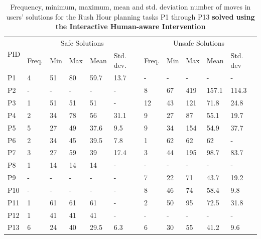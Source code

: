 \begin{table}[tpb]
\begin{tabular}{|l|l|l|l|l|l|l|l|l|l|l|}
\hline
\multirow{2}{*}{PID} & \multicolumn{5}{c|}{Safe Solutions}  & \multicolumn{5}{c|}{Unsafe Solutions} \\ \cline{2-11} 
                     & Freq. & Min & Max & Mean & Std. dev. & Freq.  & Min & Max & Mean  & Std. dev \\ \hline
P1                   & 4     & 51  & 80  & 59.7 & 13.7      & -      & -   & -   & -     & -        \\
P2                   & -     & -   & -   & -    & -         & 8      & 67  & 419 & 157.1 & 114.3    \\
P3                   & 1     & 51  & 51  & 51   & -         & 12     & 43  & 121 & 71.8  & 24.8     \\
P4                   & 2     & 34  & 78  & 56   & 31.1      & 9      & 27  & 87  & 55.1  & 19.7     \\
P5                   & 5     & 27  & 49  & 37.6 & 9.5       & 9      & 34  & 154 & 54.9  & 37.7     \\
P6                   & 2     & 34  & 45  & 39.5 & 7.8       & 1      & 62  & 62  & 62    & -        \\
P7                   & 3     & 27  & 59  & 39   & 17.4      & 3      & 44  & 195 & 98.7  & 83.7     \\
P8                   & 1     & 14  & 14  & 14   & -         & -      & -   & -   & -     & -        \\
P9                   & -     & -   & -   & -    & -         & 7      & 22  & 71  & 43.7  & 19.2     \\
P10                  & -     & -   & -   & -    & -         & 8      & 46  & 74  & 58.4  & 9.8      \\
P11                  & 1     & 61  & 61  & 61   & -         & 2      & 50  & 95  & 72.5  & 31.8     \\
P12                  & 1     & 41  & 41  & 41   & -         & -      & -   & -   & -     & -        \\
P13                  & 6     & 24  & 40  & 29.5 & 6.3       & 6      & 30  & 55  & 41.2  & 9.6      \\ \hline
\end{tabular}
\caption{Frequency, minimum, maximum, mean and std. deviation number of moves in users' solutions for the Rush Hour planning tasks P1 through P13 \textbf{solved using the Interactive Human-aware Intervention}}
\label{tab:usersolutionsphase2}
\end{table}

